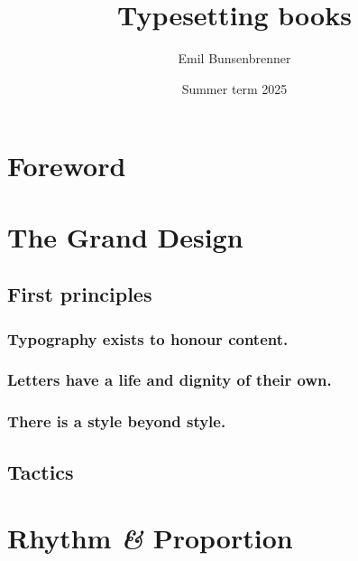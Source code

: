 \documentclass[british]{etsbook}
\begin{document}
\title      {Typesetting books}
\author     {Emil Bunsenbrenner}
\subject    {Lecture Notes}
\publishers {University of \LaTeX}
\date       {Summer term 2025}
\coverfigure{}

\maketitle

\chapter*{Foreword}
\lipsum[1-3]

\tableofcontents{}


\chapter{The Grand Design}

\section{First principles}

\subsection{Typography exists to honour content.}
\lipsum[4-8]

\subsection{Letters have a life and dignity of their own.}
\lipsum[8-11]

\subsection{There is a style beyond style.}
\lipsum[12-15]

\section{Tactics}
\lipsum[16]

\chapter{Rhythm \emph{\&} Proportion}
\lipsum[1-2]
\end{document}
